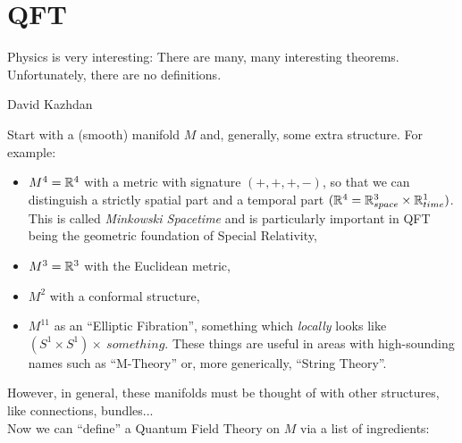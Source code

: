 \section{QFT}
\epigraph{Physics is very interesting:
There are many, many interesting theorems.
Unfortunately, there are no
definitions.}{David Kazhdan}
\noindent Start with a (smooth) manifold $M$ and, generally, some extra structure. For example:
\begin{itemize}
    \item $M^4=\mathbb{R}^4$ with a metric with signature $(+, +, +, -)$, so that we can distinguish a strictly spatial part and a temporal part $(\mathbb{R}^4=\mathbb{R}^3_{space}\times\mathbb{R}^1_{time})$. This is called \textit{Minkowski Spacetime} and is particularly important in QFT being the geometric foundation of Special Relativity,
    \item $M^3=\mathbb{R}^3$ with the Euclidean metric,
    \item $M^2$ with a conformal structure,
    \item $M^{11}$ as an ``Elliptic Fibration'', something which \textit{locally} looks like $\left(S^1\times S^1\right)\times \ something$. These things are useful in areas with high-sounding names such as ``M-Theory'' or, more generically, ``String Theory''.
\end{itemize}
However, in general, these manifolds must be thought of with other structures, like connections, bundles...\\
Now we can ``define'' a Quantum Field Theory on $M$ via a list of ingredients:

